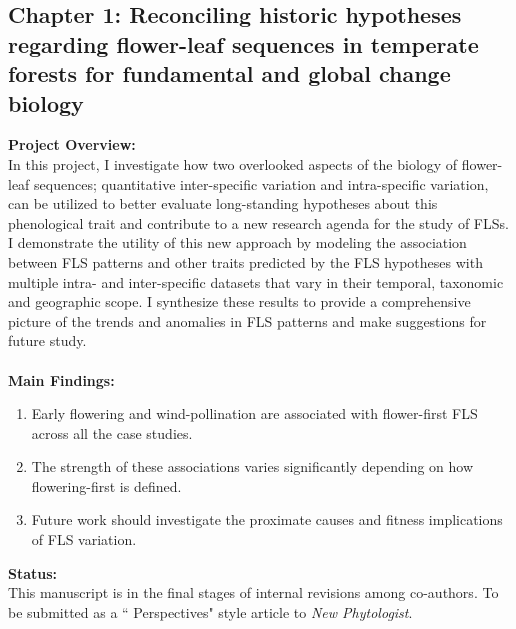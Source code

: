 \documentclass[11pt]{article}\usepackage[]{graphicx}\usepackage[]{color}
\begin{document}
\subsection*{Chapter 1: Reconciling historic hypotheses regarding flower-leaf sequences in temperate forests for fundamental and global change biology}

 \textbf{Project Overview:}\\
 \indent In this project, I investigate how two overlooked aspects of the biology of flower-leaf sequences; quantitative inter-specific variation and intra-specific variation, can be utilized to better evaluate long-standing hypotheses about this phenological trait and contribute to a new research agenda for the study of FLSs. I demonstrate the utility of this new approach by modeling the association between FLS patterns and other traits predicted by the FLS hypotheses with multiple intra- and inter-specific datasets that vary in their temporal, taxonomic and geographic scope. I synthesize these results to provide a comprehensive picture of the trends and anomalies in FLS patterns and make suggestions for future study.\\
\\
 \textbf{Main Findings:} 
\begin{enumerate}
\item Early flowering and wind-pollination are associated with flower-first FLS across all the case studies.
\item The strength of these associations varies significantly depending on how flowering-first is defined.
\item Future work should investigate the proximate causes and fitness implications of FLS variation.  
\end{enumerate}
 \textbf{Status:}\\
\indent This manuscript is in the final stages of internal revisions among co-authors. To be submitted as a `` Perspectives" style article to \textit{New Phytologist}.
\end{document}
